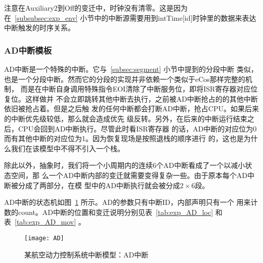 注意在Auxiliary2到Off的变迁中，时钟没有清零。这是因为在~\ref{subsubsec:exp_env} 
小节中的中断源需要用到intTime[id]时钟里的数据来表达中断触发的时序关系。

\subsubsection{AD中断模板}
\label{subsubsec:exp_ad}

AD中断是一个特殊的中断。它与~\ref{subsec:segment} 小节中提到的分段中断
类似，也是一个分段中断。然而它的分段的实现并非依赖一个类似于eCos那样完整的机制，
而是在中断自身调用特殊指令EOI清除了中断服务位，即将ISR寄存器对应位复位。这样做并
不会立即跳转其他中断去执行，之前被AD中断抢占的的其他中断依旧被抢占着。但是之后触
发的任何中断都会打断AD中断，抢占CPU。如果后来的中断优先级较低，那么就会造成优先
级反转。另外，在后来的中断运行结束之后，CPU会回到AD中断执行。尽管此时看ISR寄存器
的话，AD中断的对应位为0而有其他中断的对应位为1。因为恢复现场是按照退栈的顺序进行
的，这也是为什么我们在该模型中不得不引入一个栈。

除此以外，抽象时，我们将一个小周期内的连续6个AD中断看成了一个以减小状态空间，那
么一个AD中断内部的变迁就需要变得复杂一些。由于原本每个AD中断被分成了两部分，在模
型中的AD中断执行就会被分成$2\times 6$段。

AD中断的状态机如图~\ref{fig:exp_AD} 所示。AD的参数只有中断ID，内部声明只有一个
用来计数的count。AD中断的位置和变迁说明分别见表~\ref{tab:exp_AD_loc} 和
表~\ref{tab:exp_AD_mov} 。

\begin{figure}[H]
	\centering
	\texttt{[image: AD]}
	\caption{某航空动力控制系统中断模型：AD中断}
	\label{fig:exp_AD}
\end{figure}

